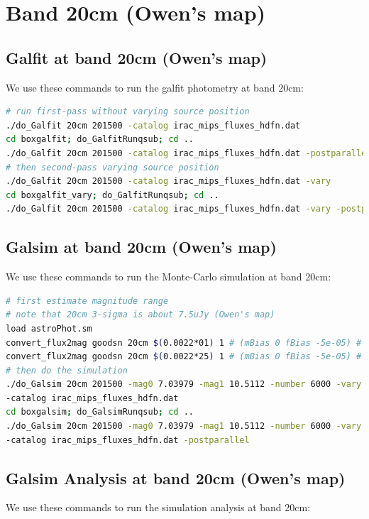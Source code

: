 \documentclass[11pt,a4paper]{article}
\begin{document}
\section{Band 20cm (Owen's map)}

\subsection{Galfit at band 20cm (Owen's map)}

We use these commands to run the galfit photometry at band 20cm:

\begin{lstlisting}[language=bash]
# run first-pass without varying source position
./do_Galfit 20cm 201500 -catalog irac_mips_fluxes_hdfn.dat
cd boxgalfit; do_GalfitRunqsub; cd ..
./do_Galfit 20cm 201500 -catalog irac_mips_fluxes_hdfn.dat -postparallel
# then second-pass varying source position
./do_Galfit 20cm 201500 -catalog irac_mips_fluxes_hdfn.dat -vary
cd boxgalfit_vary; do_GalfitRunqsub; cd ..
./do_Galfit 20cm 201500 -catalog irac_mips_fluxes_hdfn.dat -vary -postparallel
\end{lstlisting}

\subsection{Galsim at band 20cm (Owen's map)}

We use these commands to run the Monte-Carlo simulation at band 20cm:

\begin{lstlisting}[language=bash]
# first estimate magnitude range
# note that 20cm 3-sigma is about 7.5uJy (Owen's map)
load astroPhot.sm
convert_flux2mag goodsn 20cm $(0.0022*01) 1 # (mBias 0 fBias -5e-05) # => 10.5112
convert_flux2mag goodsn 20cm $(0.0022*25) 1 # (mBias 0 fBias -5e-05) # => 7.03979
# then do the simulation
./do_Galsim 20cm 201500 -mag0 7.03979 -mag1 10.5112 -number 6000 -vary \
-catalog irac_mips_fluxes_hdfn.dat
cd boxgalsim; do_GalsimRunqsub; cd ..
./do_Galsim 20cm 201500 -mag0 7.03979 -mag1 10.5112 -number 6000 -vary \
-catalog irac_mips_fluxes_hdfn.dat -postparallel
\end{lstlisting}

\subsection{Galsim Analysis at band 20cm (Owen's map)}

We use these commands to run the simulation analysis at band 20cm:
\end{document}

